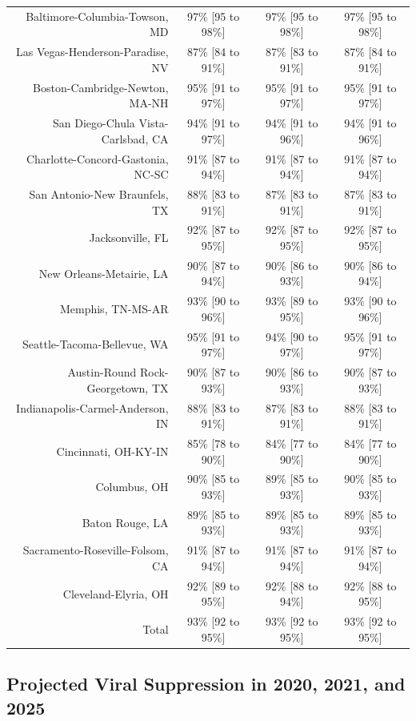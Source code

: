 \documentclass{article}
\begin{document}
\begin{table}[H]
\begin{tabular}{|r|c|c|c|}
		Baltimore-Columbia-Towson, MD & 97\% [95 to 98\%] & 97\% [95 to 98\%] & 97\% [95 to 98\%]\\
		Las Vegas-Henderson-Paradise, NV & 87\% [84 to 91\%] & 87\% [83 to 91\%] & 87\% [84 to 91\%]\\
		Boston-Cambridge-Newton, MA-NH & 95\% [91 to 97\%] & 95\% [91 to 97\%] & 95\% [91 to 97\%]\\
		San Diego-Chula Vista-Carlsbad, CA & 94\% [91 to 97\%] & 94\% [91 to 96\%] & 94\% [91 to 96\%]\\
		Charlotte-Concord-Gastonia, NC-SC & 91\% [87 to 94\%] & 91\% [87 to 94\%] & 91\% [87 to 94\%]\\
		San Antonio-New Braunfels, TX & 88\% [83 to 91\%] & 87\% [83 to 91\%] & 87\% [83 to 91\%]\\
		Jacksonville, FL & 92\% [87 to 95\%] & 92\% [87 to 95\%] & 92\% [87 to 95\%]\\
		New Orleans-Metairie, LA & 90\% [87 to 94\%] & 90\% [86 to 93\%] & 90\% [86 to 94\%]\\
		Memphis, TN-MS-AR & 93\% [90 to 96\%] & 93\% [89 to 95\%] & 93\% [90 to 96\%]\\
		Seattle-Tacoma-Bellevue, WA & 95\% [91 to 97\%] & 94\% [90 to 97\%] & 95\% [91 to 97\%]\\
		Austin-Round Rock-Georgetown, TX & 90\% [87 to 93\%] & 90\% [86 to 93\%] & 90\% [87 to 93\%]\\
		Indianapolis-Carmel-Anderson, IN & 88\% [83 to 91\%] & 87\% [83 to 91\%] & 88\% [83 to 91\%]\\
		Cincinnati, OH-KY-IN & 85\% [78 to 90\%] & 84\% [77 to 90\%] & 84\% [77 to 90\%]\\
		Columbus, OH & 90\% [85 to 93\%] & 89\% [85 to 93\%] & 90\% [85 to 93\%]\\
		Baton Rouge, LA & 89\% [85 to 93\%] & 89\% [85 to 93\%] & 89\% [85 to 93\%]\\
		Sacramento-Roseville-Folsom, CA & 91\% [87 to 94\%] & 91\% [87 to 94\%] & 91\% [87 to 94\%]\\
		Cleveland-Elyria, OH & 92\% [89 to 95\%] & 92\% [88 to 94\%] & 92\% [88 to 95\%]\\
		\hline
		Total & 93\% [92 to 95\%] & 93\% [92 to 95\%] & 93\% [92 to 95\%]\\
		\hline
	\end{tabular}
\end{table}


\subsection{Projected Viral Suppression in 2020, 2021, and 2025}
\end{document}
